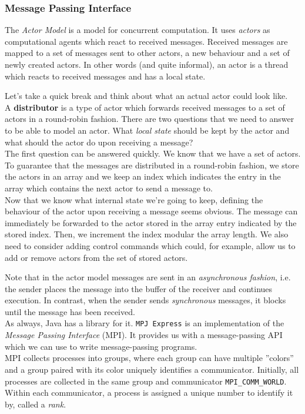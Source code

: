 \documentclass[main]{subfiles}
\begin{document}
\subsubsection{Message Passing Interface}
The \textit{Actor Model} is a model for concurrent computation. It uses \textit{actors} as computational agents which react to received messages. Received messages are mapped to a set of messages sent to other actors, a new behaviour and a set of newly created actors. In other words (and quite informal), an actor is a thread which reacts to received messages and has a local state.
\begin{example}
    Let's take a quick break and think about what an actual actor could look like.\\[3mm]
    A \textbf{distributor} is a type of actor which forwards received messages to a set of actors in a round-robin fashion. There are two questions that we need to answer to be able to model an actor. What \textit{local state} should be kept by the actor and what should the actor do upon receiving a message? \\[3mm]
    The first question can be answered quickly. We know that we have a set of actors. To guarantee that the messages are distributed in a round-robin fashion, we store the actors in an array and we keep an index which indicates the entry in the array which contains the next actor to send a message to.\\[3mm]
    Now that we know what internal state we're going to keep, defining the behaviour of the actor upon receiving a message seems obvious. The message can immediately be forwarded to the actor stored in the array entry indicated by the stored index. Then, we increment the index modular the array length. We also need to consider adding control commands which could, for example, allow us to add or remove actors from the set of stored actors.
\end{example}
Note that in the actor model messages are sent in an \textit{asynchronous fashion}, i.e. the sender places the message into the buffer of the receiver and continues execution. In contrast, when the sender sends \textit{synchronous} messages, it blocks until the message has been received.\\[3mm]
As always, Java has a library for it. \texttt{MPJ Express} is an implementation of the \textit{Message Passing Interface} (MPI). It provides us with a message-passing API which we can use to write message-passing programs.\\[3mm]
MPI collects processes into groups, where each group can have multiple ''colors'' and a group paired with its color uniquely identifies a communicator. Initially, all processes are collected in the same group and communicator \texttt{MPI\_COMM\_WORLD}. Within each communicator, a process is assigned a unique number to identify it by, called a \textit{rank}.
\end{document}
